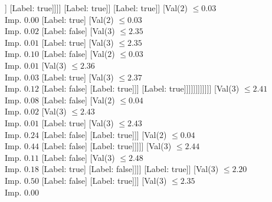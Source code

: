 \documentclass[margin=10pt]{standalone}
\begin{document}
\begin{forest}
																				[Label: true]
																				[Val($3$) $ \leq 2.20$ \\ Imp. $0.14$
																					[Label: false]
																					[Val($2$) $ \leq 0.03$ \\ Imp. $0.05$
																						[Val($3$) $ \leq 2.21$ \\ Imp. $0.44$
																							[Label: true]
																							[Label: false]]
																						[Label: true]]]]
																			[Label: true]]
																		[Label: true]]
																	[Val($2$) $ \leq 0.03$ \\ Imp. $0.00$
																		[Label: true]
																		[Val($2$) $ \leq 0.03$ \\ Imp. $0.02$
																			[Label: false]
																			[Val($3$) $ \leq 2.35$ \\ Imp. $0.01$
																				[Label: true]
																				[Val($3$) $ \leq 2.35$ \\ Imp. $0.10$
																					[Label: false]
																					[Val($2$) $ \leq 0.03$ \\ Imp. $0.01$
																						[Val($3$) $ \leq 2.36$ \\ Imp. $0.03$
																							[Label: true]
																							[Val($3$) $ \leq 2.37$ \\ Imp. $0.12$
																								[Label: false]
																								[Label: true]]]
																						[Label: true]]]]]]]]]]]]
											[Val($3$) $ \leq 2.41$ \\ Imp. $0.08$
												[Label: false]
												[Val($2$) $ \leq 0.04$ \\ Imp. $0.02$
													[Val($3$) $ \leq 2.43$ \\ Imp. $0.01$
														[Label: true]
														[Val($3$) $ \leq 2.43$ \\ Imp. $0.24$
															[Label: false]
															[Label: true]]]
													[Val($2$) $ \leq 0.04$ \\ Imp. $0.44$
														[Label: false]
														[Label: true]]]]]
										[Val($3$) $ \leq 2.44$ \\ Imp. $0.11$
											[Label: false]
											[Val($3$) $ \leq 2.48$ \\ Imp. $0.18$
												[Label: true]
												[Label: false]]]]
									[Label: true]]
								[Val($3$) $ \leq 2.20$ \\ Imp. $0.50$
									[Label: false]
									[Label: true]]]
							[Val($3$) $ \leq 2.35$ \\ Imp. $0.00$

\end{forest}
\end{document}
